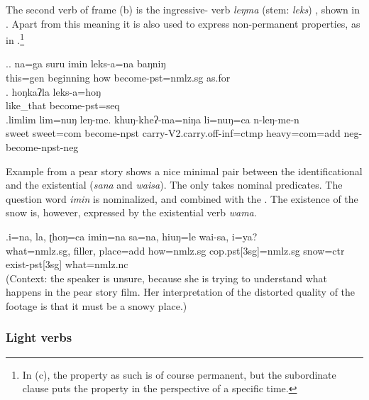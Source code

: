 The second verb of frame (b) is the ingressive- verb \emph{leŋma} (stem: \emph{leks}) , shown in \Next. Apart from this meaning it is also used to express non-permanent properties, as in \Next[c].\footnote{In (c), the property as such is of course permanent, but the subordinate clause puts the property in the perspective of a specific time.}

\ex.\ag. na=ga  suru   imin leks-a=na    baŋniŋ \\
		this{\sc =gen} beginning how become{\sc [3sg]-pst=nmlz.sg} as.for	\\
	 
	\bg.  hoŋkaʔla  leks-a=hoŋ\\
	like\_that become{\sc [3sg]-pst=seq}			\\
 
\bg.limlim lim=nuŋ leŋ-me.     khuŋ-kheʔ-ma=niŋa          li=nuŋ=ca    n-leŋ-me-n\\
sweet sweet{\sc =com} become{\sc [3sg]-npst} carry{\sc -V2.carry.off-inf=ctmp} heavy{\sc =com=add} {\sc neg-}become{\sc [3sg]-npst-neg}\\


Example \Next from a pear story shows a nice minimal pair between the identificational and the existential  (\emph{sana} and \emph{waisa}). The  only takes nominal predicates. The question word \emph{imin}  is nominalized, and combined with the . The existence of the snow is, however, expressed by the existential  verb \emph{wama}.

\exg.i=na, la, ʈhoŋ=ca       imin=na       sa=na,        hiuŋ=le      wai-sa,  i=ya?\\
what{\sc =nmlz.sg}, {\sc filler}, place{\sc =add} how{\sc =nmlz.sg} {\sc cop.pst[3sg]=nmlz.sg} snow{\sc =ctr} exist{\sc -pst[3sg]} what{\sc =nmlz.nc}\\
 (Context: the speaker is unsure, because she is trying to understand what happens in the pear story film. Her interpretation of the distorted quality of the footage is that it must be a snowy place.)	

\subsubsection{Light verbs}

